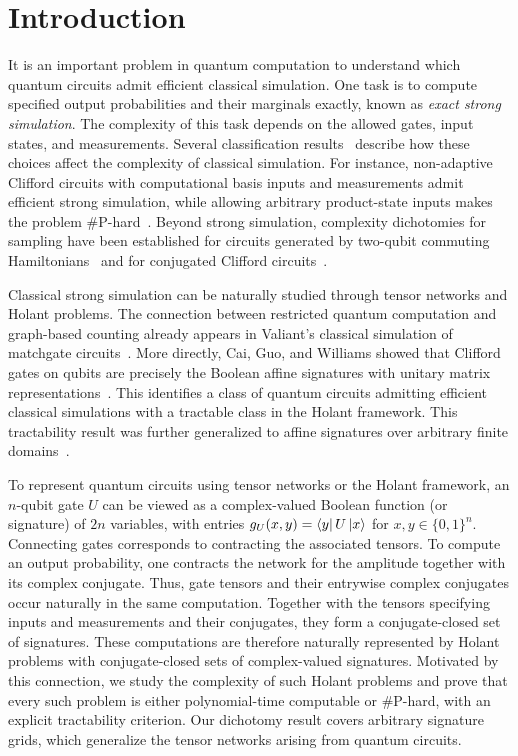 
\section{Introduction}

It is an important problem in quantum computation to understand which quantum circuits admit efficient classical simulation. One task is to compute specified output probabilities and their marginals exactly, known as \emph{exact strong simulation}. The complexity of this task depends on the allowed gates, input states, and measurements. Several classification results~\cite{jozsa-vandenNest2014,koh2017extensions,hebenstreit2020matchgates,bu-koh2022halfgauss} describe how these choices affect the complexity of classical simulation. For instance,  non-adaptive Clifford circuits with computational basis inputs and measurements admit efficient strong simulation, while allowing arbitrary product-state inputs makes the problem \#P-hard~\cite{jozsa-vandenNest2014}. Beyond strong simulation, complexity dichotomies for sampling have been established for circuits generated by two-qubit commuting Hamiltonians~\cite{bouland2016commuting} and for conjugated Clifford circuits~\cite{bouland2018conjugated}.

Classical strong simulation can be naturally studied through tensor networks and Holant problems. The connection between restricted quantum computation and graph-based counting already appears in Valiant's classical simulation of matchgate circuits~\cite{valiant2002quantum}. More directly, Cai, Guo, and Williams showed that Clifford gates on qubits are precisely the Boolean affine signatures with unitary matrix representations~\cite{cai-guo-williams-clifford}. This identifies a class of  quantum circuits admitting efficient classical simulations with a tractable class in the Holant framework. This tractability result was further generalized to affine signatures over arbitrary finite domains~\cite{bu-koh2022halfgauss}.

To represent quantum circuits using tensor networks or the Holant framework, an $n$-qubit gate $U$ can be viewed as a complex-valued Boolean function (or signature) of $2n$ variables, with entries
$g_U(x,y)=\bra{y}U\ket{x}$ for $
    x,y\in\{0,1\}^n.$
Connecting gates corresponds to contracting the associated tensors. To compute an output probability, one contracts the network for the amplitude together with its complex conjugate. Thus, gate tensors and their entrywise complex conjugates occur naturally in the same computation. Together with the tensors specifying inputs and measurements and their conjugates, they form a conjugate-closed set of signatures. These computations are therefore naturally represented by Holant problems with conjugate-closed sets of complex-valued signatures. Motivated by this connection, we study the complexity of such Holant problems and prove that every such problem is either polynomial-time computable or \#P-hard, with an explicit tractability criterion. Our dichotomy result covers arbitrary signature grids, which generalize the tensor networks arising from quantum circuits.

